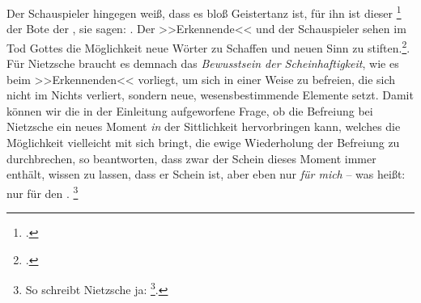 \documentclass[12pt, a4paper, openany]{report}
\begin{document}
Der Schauspieler hingegen weiß, dass es bloß Geistertanz ist, für ihn ist dieser \footcite[][481]{nietzsche_morgenrote_1999} der Bote der , sie sagen: .
Der >>Erkennende<< und der Schauspieler sehen im Tod Gottes die Möglichkeit neue Wörter zu Schaffen und neuen Sinn zu stiften.\footcite[Vgl.][70]{stephan_nietzscheanismus_2019}. 
Für Nietzsche braucht es demnach das \emph{Bewusstsein der Scheinhaftigkeit}, wie es beim >>Erkennenden<< vorliegt, um sich in einer Weise zu befreien, die sich nicht im Nichts verliert, sondern neue, wesensbestimmende Elemente setzt.
Damit können wir die in der Einleitung aufgeworfene Frage, ob die Befreiung bei Nietzsche ein neues Moment \emph{in} der Sittlichkeit hervorbringen kann, welches die Möglichkeit vielleicht mit sich bringt, die ewige Wiederholung der Befreiung zu durchbrechen, so beantworten, dass zwar der Schein dieses Moment immer enthält, wissen zu lassen, dass er Schein ist, aber eben nur \emph{für mich} -- was heißt: nur für den .%
\footnote{
    So schreibt Nietzsche ja: \footcite[][S. 417. Hervorhebung von mir]{nietzsche_morgenrote_1999}.
}
\end{document}
